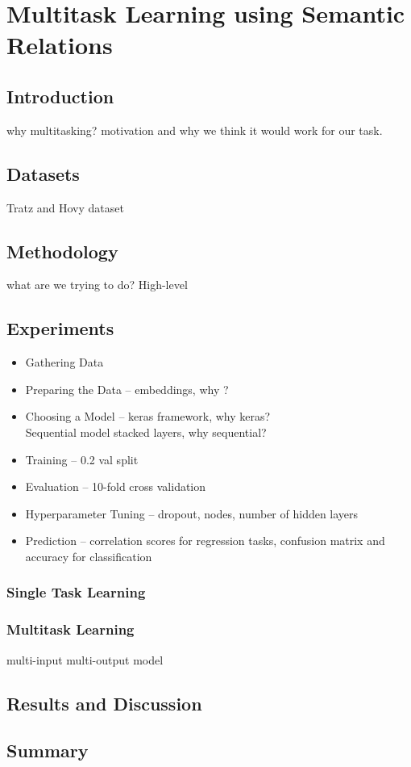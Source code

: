 \chapter{Multitask Learning using Semantic Relations}

\section{Introduction}
why multitasking? motivation and why we think it would work for our task.

\section{Datasets}
Tratz and Hovy dataset
\section{Methodology}
what are we trying to do? High-level
\section{Experiments}
\begin{itemize}
    \item Gathering Data
    \item Preparing the Data -- \infersent embeddings, why \infersent?
    \item Choosing a Model -- keras framework, why keras? \\ Sequential model stacked layers, why sequential?
    \item Training -- 0.2 val split
    \item Evaluation -- 10-fold cross validation
    \item Hyperparameter Tuning -- dropout, nodes, number of hidden layers
    \item Prediction -- correlation scores for regression tasks, confusion matrix and accuracy for classification
\end{itemize}
\subsection{Single Task Learning}
\subsection{Multitask Learning}
multi-input multi-output model
\section{Results and Discussion}
\section{Summary}